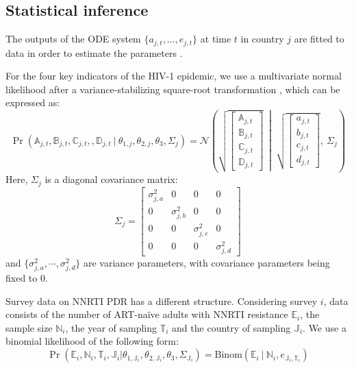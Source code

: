 \documentclass{article}
\begin{document}
	
	\subsection{Statistical inference}
	
	The outputs of the ODE system $	\{a_{j,t},\ldots,e_{j,t}\}$ at time $t$ in country $j$ are fitted to data in order to estimate the parameters .
	
	For the four key indicators of the HIV-1 epidemic, we use a multivariate normal likelihood after a variance-stabilizing square-root transformation \cite{yu2009variance}, which can be expressed as:
	\begin{equation}
	\label{eq:abcd}
	\Pr(
	\mathds{A}_{j,t},\mathds{B}_{j,t},\mathds{C}_{j,t},,\mathds{D}_{j,t} \ | \ \theta_{1,j},\theta_{2,j},\theta_3,\Sigma_j )  = 
	\mathcal{N}\left(
	\sqrt{
		\begin{bmatrix}\mathds{A}_{j,t} \\ \mathds{B}_{j,t} \\ \mathds{C}_{j,t} \\ \mathds{D}_{j,t} \end{bmatrix} 
	}
	\ \middle| \
	\sqrt{
		\begin{bmatrix}a_{j,t} \\ b_{j,t} \\ c_{j,t}\\ d_{j,t}\end{bmatrix} 
	}
	,  \
	\Sigma_j
	\right)
	\end{equation}
	Here, $\Sigma_j$ is a diagonal covariance matrix:
	\begin{equation}
	\Sigma_j = 
	\begin{bmatrix}
	\sigma_{j,a}^2 & 0 &0 & 0 \\
	0 & \sigma_{j,b}^2  &0 &0 \\
	0 & 0 & \sigma_{j,c}^2 & 0 \\
	0 & 0 & 0 & \sigma_{j,d}^2 
	\end{bmatrix}
	\end{equation}
	and $\{\sigma_{j,a}^2,\cdots,\sigma_{j,d}^2\}$ are variance parameters, with covariance parameters being fixed to 0.
	
	Survey data on NNRTI PDR has a different structure.
	Considering survey $i$, data consists of the number of ART-naïve adults with NNRTI resistance $\mathds{E}_i$, the sample size $\mathds{N}_i$, the year of sampling $\mathds{T}_i$ and the country of sampling $\mathds{J}_i$.
	We use a binomial likelihood of the following form:
	\begin{equation}
	\label{eq:e}
	\Pr(\mathds{E}_i,\mathds{N}_i,\mathds{T}_i,\mathds{J}_i | \theta_{1,\mathds{J}_i},\theta_{2,\mathds{J}_i},\theta_3,\Sigma_{\mathds{J}_i}) = \text{Binom}(\mathds{E}_i  \ | \ \mathds{N}_i, e_{\mathds{J}_i,\mathds{T}_i})
	\end{equation}
	
\end{document}
